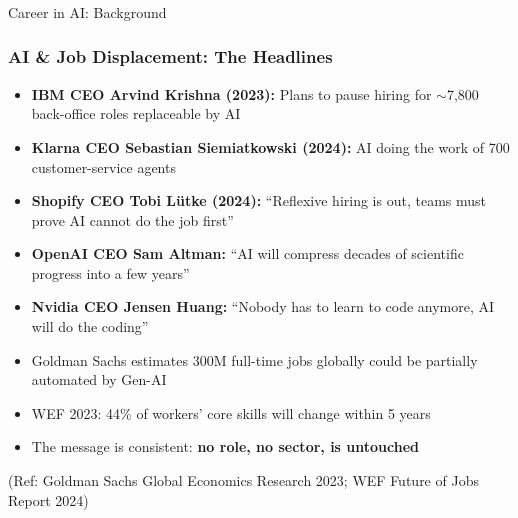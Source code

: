 \begin{frame}[fragile]\frametitle{}
\begin{center}
{\Large Career in AI: Background}
\end{center}
\end{frame}

\begin{frame}[fragile]\frametitle{AI \& Job Displacement: The Headlines}
\begin{itemize}
  \item \textbf{IBM CEO Arvind Krishna (2023):} Plans to pause hiring for $\sim$7,800 back-office roles replaceable by AI
  \item \textbf{Klarna CEO Sebastian Siemiatkowski (2024):} AI doing the work of 700 customer-service agents
  \item \textbf{Shopify CEO Tobi L\"{u}tke (2024):} ``Reflexive hiring is out, teams must prove AI cannot do the job first''
  \item \textbf{OpenAI CEO Sam Altman:} ``AI will compress decades of scientific progress into a few years''
  \item \textbf{Nvidia CEO Jensen Huang:} ``Nobody has to learn to code anymore, AI will do the coding''
  \item Goldman Sachs estimates 300M full-time jobs globally could be partially automated by Gen-AI
  \item WEF 2023: 44\% of workers' core skills will change within 5 years
  \item The message is consistent: \textbf{no role, no sector, is untouched}
\end{itemize}
{\tiny (Ref: Goldman Sachs Global Economics Research 2023; WEF Future of Jobs Report 2024)}
\end{frame}
 
